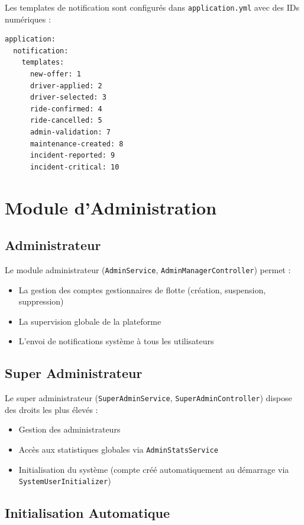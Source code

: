 \documentclass[12pt,a4paper]{report}
\begin{document}
Les templates de notification sont configurés dans \texttt{application.yml} avec des IDs numériques :

\begin{lstlisting}[style=yamlStyle, caption={Configuration des templates de notification}]
application:
  notification:
    templates:
      new-offer: 1
      driver-applied: 2
      driver-selected: 3
      ride-confirmed: 4
      ride-cancelled: 5
      admin-validation: 7
      maintenance-created: 8
      incident-reported: 9
      incident-critical: 10
\end{lstlisting}

\section{Module d'Administration}

\subsection{Administrateur}

Le module administrateur (\texttt{AdminService}, \texttt{AdminManagerController}) permet :
\begin{itemize}[leftmargin=2cm]
  \item La gestion des comptes gestionnaires de flotte (création, suspension, suppression)
  \item La supervision globale de la plateforme
  \item L'envoi de notifications système à tous les utilisateurs
\end{itemize}

\subsection{Super Administrateur}

Le super administrateur (\texttt{SuperAdminService}, \texttt{SuperAdminController}) dispose des droits les plus élevés :
\begin{itemize}[leftmargin=2cm]
  \item Gestion des administrateurs
  \item Accès aux statistiques globales via \texttt{AdminStatsService}
  \item Initialisation du système (compte créé automatiquement au démarrage via \texttt{SystemUserInitializer})
\end{itemize}

\subsection{Initialisation Automatique}
\end{document}
